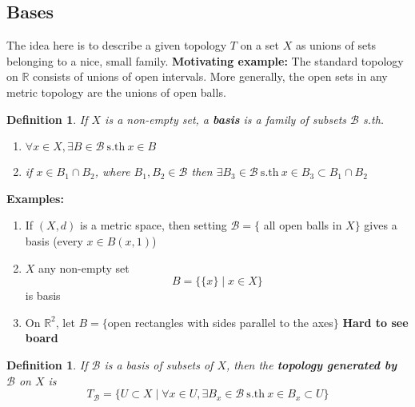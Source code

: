 \documentclass{article}
\newcommand{\sth}{\mathrm{s.th}\ }
\newcommand{\R}{\mathbb{R}}
\newcommand{\ba}{\mathcal{B}}
\newtheorem{sdefinition}[stheorem]{Definition}
\theoremstyle{remark}
\theoremstyle{example}
\theoremstyle{examples}
\begin{document}
	\subsection{Bases}
	The idea here is to describe a given topology $T$ on a set $X$ as unions of sets belonging to a nice, small family.
	\textbf{Motivating example:} The standard topology on $\R$ consists of unions of open intervals. More generally, the open sets in any metric topology are the unions of open balls.
	\addtocounter{theorem}{1}
	\setcounter{stheorem}{0}
	\begin{sdefinition}
		If $X$ is a non-empty set, a \textbf{basis} is a family of subsets $\ba$ s.th. \begin{enumerate}
			\item $\forall x \in X, \exists B \in \ba\ \sth x \in B$
			\item if $x \in B_1 \cap B_2$, where $B_1,B_2 \in \ba$ then $\exists B_3 \in \ba\ \sth x \in B_3 \subset B_1 \cap B_2$
		\end{enumerate}
	\end{sdefinition}
	\textbf{Examples:}
	\begin{enumerate}
		\item If $(X,d)$ is a metric space, then setting $\ba=\{$ all open balls in $X\}$ gives a basis (every $x \in B(x,1)$)
		\item $X$ any non-empty set \[B=\{\{x\} \mid x \in X\}\] is basis
		\item On $\R^2$, let $B=\{$open rectangles with sides parallel to the axes$\}$
		\textbf{Hard to see board}
	\end{enumerate}

	\begin{sdefinition}
		\label{defgeneratedtopology}
		If $\ba$ is a basis of subsets of $X$, then the \textbf{topology generated by} $\mathbf{\ba}$ on $X$ is \[T_\ba = \{U \subset X \mid \forall x \in U, \exists B_x \in \ba \ \sth x \in B_x \subset U\}\]
	\end{sdefinition}
\end{document}
